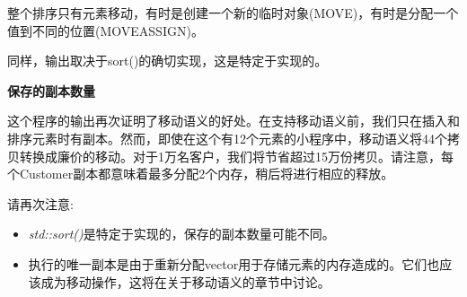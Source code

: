 整个排序只有元素移动，有时是创建一个新的临时对象(MOVE)，有时是分配一个值到不同的位置(MOVEASSIGN)。\par

同样，输出取决于sort()的确切实现，这是特定于实现的。\par

\textbf{保存的副本数量}

这个程序的输出再次证明了移动语义的好处。在支持移动语义前，我们只在插入和排序元素时有副本。然而，即使在这个有12个元素的小程序中，移动语义将44个拷贝转换成廉价的移动。对于1万名客户，我们将节省超过15万份拷贝。请注意，每个Customer副本都意味着最多分配2个内存，稍后将进行相应的释放。\par

请再次注意:\par

\begin{itemize}
	\item \textit{std::sort()}是特定于实现的，保存的副本数量可能不同。
	\item 执行的唯一副本是由于重新分配vector用于存储元素的内存造成的。它们也应该成为移动操作，这将在关于移动语义的章节中讨论。
\end{itemize}

























